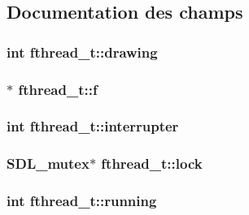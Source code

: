 \subsection{\-Documentation des champs}
\hypertarget{structfthread__t_a7fbee2fd4f87ca64bd6018eac296a42d}{
\subsubsection[{drawing}]{\setlength{\rightskip}{0pt plus 5cm}int {\bf fthread\-\_\-t\-::drawing}}}\label{structfthread__t_a7fbee2fd4f87ca64bd6018eac296a42d}
\hypertarget{structfthread__t_ad66de094ec352eca5bc2ce15931ee752}{
\subsubsection[{f}]{$\ast$ {\bf fthread\-\_\-t\-::f}}}\label{structfthread__t_ad66de094ec352eca5bc2ce15931ee752}
\hypertarget{structfthread__t_aeb3200e557bbf08131983b5490eb3a18}{
\subsubsection[{interrupter}]{\setlength{\rightskip}{0pt plus 5cm}int {\bf fthread\-\_\-t\-::interrupter}}}\label{structfthread__t_aeb3200e557bbf08131983b5490eb3a18}
\hypertarget{structfthread__t_a08a1c07dac85a5e5627314400573b29a}{
\subsubsection[{lock}]{\setlength{\rightskip}{0pt plus 5cm}\-S\-D\-L\-\_\-mutex$\ast$ {\bf fthread\-\_\-t\-::lock}}}\label{structfthread__t_a08a1c07dac85a5e5627314400573b29a}
\hypertarget{structfthread__t_aa634e730b851175842d36df4cc04bd2b}{
\subsubsection[{running}]{\setlength{\rightskip}{0pt plus 5cm}int {\bf fthread\-\_\-t\-::running}}}\label{structfthread__t_aa634e730b851175842d36df4cc04bd2b}
